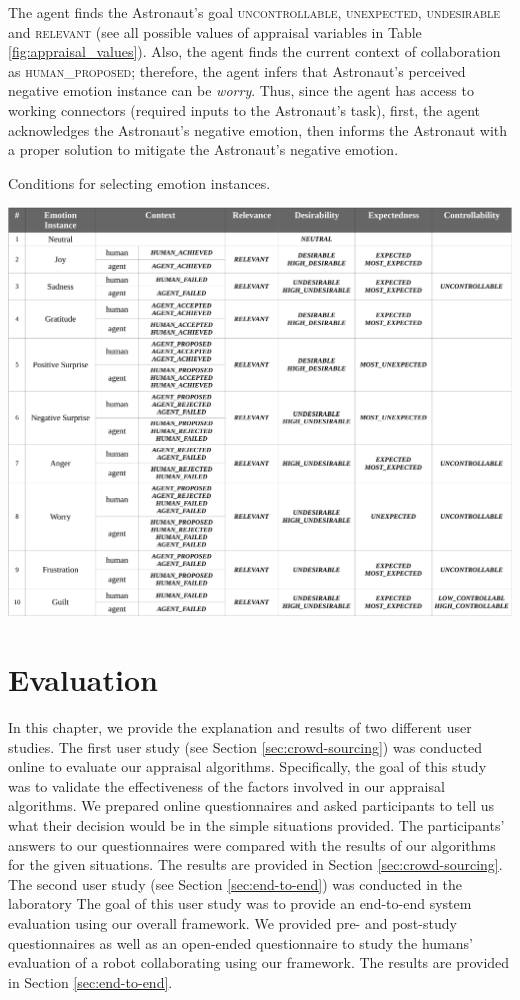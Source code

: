 \documentclass[12pt]{report}
\begin{document}
The agent finds the Astronaut's goal \textsc{uncontrollable},
\textsc{unexpected}, \textsc{undesirable} and \textsc{relevant} (see all
possible values of appraisal variables in Table \ref{fig:appraisal_values}).
Also, the agent finds the current context of collaboration as
\textsc{human\_proposed}; therefore, the agent infers that Astronaut's
perceived negative emotion instance can be \textit{worry}. Thus, since the agent
has access to working connectors (required inputs to the Astronaut's task),
first, the agent acknowledges the Astronaut's negative emotion, then informs
the Astronaut with a proper solution to mitigate the Astronaut's negative
emotion.


\begin{table}
  \centering
  \caption{Conditions for selecting emotion instances.}
  \label{fig:emotion_elicitation}
  \includegraphics[width=1\textwidth]{figure/emotion_elicitation_croped.pdf}
\end{table}

\chapter{Evaluation}
\label{ch:awareness}

In this chapter, we provide the explanation and results of two different user
studies. The first user study (see Section \ref{sec:crowd-sourcing}) was
conducted online to evaluate our appraisal algorithms. Specifically, the goal of
this study was to validate the effectiveness of the factors involved in our
appraisal algorithms. We prepared online questionnaires and asked participants
to tell us what their decision would be in the simple situations provided. The
participants' answers to our questionnaires were compared with the results of
our algorithms for the given situations. The results are provided in Section
\ref{sec:crowd-sourcing}. The second user study (see Section
\ref{sec:end-to-end}) was conducted in the laboratory The goal of this user
study was to provide an end-to-end system evaluation using our overall
framework. We provided pre- and post-study questionnaires as well as an
open-ended questionnaire to study the humans' evaluation of a robot
collaborating using our framework. The results are provided in Section
\ref{sec:end-to-end}.
\end{document}
